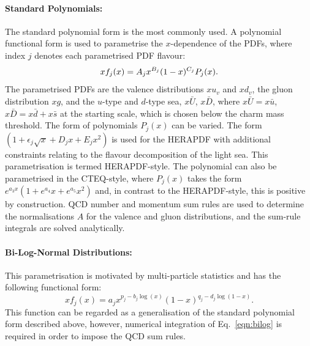 \paragraph{Standard Polynomials:} 
The standard polynomial form is the most commonly used. A polynomial functional form is used to parametrise the $x$-dependence of the PDFs, where index $j$ denotes each parametrised PDF flavour:
\begin{equation}
\centering
 xf_j(x) = A_j x^{B_j} (1-x)^{C_j} P_j(x).
\label{eqn:pdf_std}
\end{equation}
The parametrised PDFs are the valence distributions
$xu_v$ and $xd_v$, the gluon distribution $xg$, and the $u$-type and $d$-type sea,
$x\bar{U}$, $x\bar{D}$, where $x\bar{U} = x\bar{u}$, 
$x\bar{D} = x\bar{d} +x\bar{s}$ at the starting scale, which is 
chosen below the charm mass threshold. 
The form of polynomials $P_j(x)$ can be varied.
The form $(1 + \epsilon_j \sqrt{x} + D_j x + E_j x^2)$
is used for the HERAPDF \cite{h1zeus:2009wt} 
with additional constraints relating to the flavour decomposition of the 
light sea. This parametrisation is termed HERAPDF-style. The polynomial can also
be parametrised in the CTEQ-style, where $P_j(x)$ takes the form $e^{a_3x} (1 + e^{a_4} x + e^{a_5} x^2)$ and,
in contrast to  the HERAPDF-style, this is positive by construction.
QCD number and momentum sum rules are used to determine the normalisations $A$ for the valence and gluon
distributions, and the sum-rule integrals are solved analytically.
\paragraph{Bi-Log-Normal Distributions:} 
This parametrisation is motivated by multi-particle statistics
and has the following functional form:
\begin{equation}
 xf_j(x)=a_j x^{p_j-b_j\log(x)}(1-x)^{q_j-d_j \log(1-x)}.
\label{eqn:bilog}
\end{equation}
This function can be regarded as a generalisation of the standard polynomial form described above,
however, numerical integration of Eq.~\ref{eqn:bilog} is required in order to impose the QCD sum rules.
